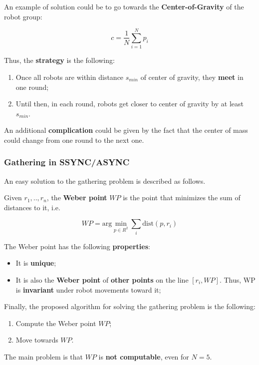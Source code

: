 An example of solution could be to go towards the \textbf{Center-of-Gravity} of the robot group:

$$
c = \frac{1}{N} \sum_{i = 1}^N p_i
$$


Thus, the \textbf{strategy} is the following:
\begin{enumerate}
    \item Once all robots are within distance $s_{min}$ of center of gravity, they \textbf{meet} in one round;
    \item Until then, in each round, robots get closer to center of gravity by at least $s_{min}$.
\end{enumerate}

An additional \textbf{complication} could be given by the fact that the center of mass could change from one round to the next one.

\subsubsection{Gathering in SSYNC/ASYNC}
An easy solution to the gathering problem is described as follows. 

Given $r_1, .., r_n$, the \textbf{Weber point} $WP$ is the point that minimizes the sum of distances to it, i.e.

$$
WP = \text{arg}\min_{p \in R^2} \sum_i \text{dist}(p,r_i)
$$

The Weber point has the following \textbf{properties}:
\begin{itemize}
    \item It is \textbf{unique};
    \item It is also the \textbf{Weber point} of \textbf{other points} on the line $[r_i, WP]$. Thus, WP is \textbf{invariant} under robot movements toward it;
\end{itemize}

Finally, the proposed algorithm for solving the gathering problem is the following:
\begin{enumerate}
    \item Compute the Weber point $WP$;
    \item Move towards $WP$.
\end{enumerate}

The main problem is that $WP$ is \textbf{not computable}, even for $N = 5$.


